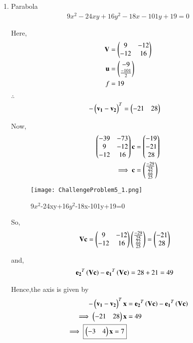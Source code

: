 \documentclass[journal,12pt,twocolumn]{IEEEtran}
\begin{document}
\begin{enumerate}
    \item Parabola
    \begin{align}
    9x^2-24xy+16y^2-18x-101y+19 = 0
    \end{align}
    
    Here,
    \begin{align}
    \mathbf{V} &= \begin{pmatrix}9 & -12 \\ -12 & 16\end{pmatrix} \\
    \mathbf{u} &= \begin{pmatrix}-9 \\ \frac{-101}{2}\end{pmatrix} \\
    f &= 19
    \end{align}

    $\therefore$
    \begin{align}
    -\begin{pmatrix}\mathbf{v_1}-\mathbf{v_2}\end{pmatrix}^T &= \begin{pmatrix}-21 & 28\end{pmatrix}
    \end{align}

    Now,
    \begin{align}
    \begin{pmatrix}-39 & -73 \\ 9 & -12 \\ -12 & 16\end{pmatrix}\mathbf{c} &= \begin{pmatrix}-19 \\ -21 \\ 28\end{pmatrix}
    \\
    \implies \mathbf{c} &= \begin{pmatrix}\frac{-29}{25} \\ \frac{22}{25}\end{pmatrix}
    \end{align}
    
    \begin{figure}[!ht]
    \centering
    \texttt{[image: ChallengeProblem5\_1.png]}
    \caption{9$x^2$-24xy+16$y^2$-18x-101y+19=0}
    \label{ex1}	
    \end{figure}

    So,
    \begin{align}
    \mathbf{V}\mathbf{c} &= \begin{pmatrix}9 & -12 \\ -12 & 16\end{pmatrix}\begin{pmatrix}\frac{-29}{25} \\ \frac{22}{25}\end{pmatrix}=\begin{pmatrix}-21 \\ 28\end{pmatrix}
    \end{align}

    and,
    \begin{align}
    \mathbf{e_2}^T\left(\mathbf{V}\mathbf{c}\right) - \mathbf{e_1}^T\left(\mathbf{V}\mathbf{c}\right) &= 28+21=49
    \end{align}

    Hence,the axis is given by
    \begin{align}
    -\begin{pmatrix}\mathbf{v_1}-\mathbf{v_2}\end{pmatrix}^T\mathbf{x} &=\mathbf{e_2}^T\left(\mathbf{V}\mathbf{c}\right) - \mathbf{e_1}^T\left(\mathbf{V}\mathbf{c}\right)\\
    \implies \begin{pmatrix}-21 & 28\end{pmatrix}\mathbf{x} &= 49
    \\
    \implies \boxed{\begin{pmatrix}-3 & 4\end{pmatrix}\mathbf{x} = 7}
    \end{align}
    

\end{enumerate}
\end{document}
